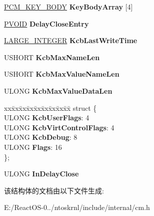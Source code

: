 \begin{DoxyCompactItemize}
\begin{tabbing}
\end{tabbing}\item 
\mbox{\label{struct___c_m___k_e_y___c_o_n_t_r_o_l___b_l_o_c_k_aa6c5935056a5008230d3e998815fb361}} 
\hyperlink{struct___c_m___k_e_y___b_o_d_y}{P\+C\+M\+\_\+\+K\+E\+Y\+\_\+\+B\+O\+DY} {\bfseries Key\+Body\+Array} \mbox{[}4\mbox{]}
\item 
\mbox{\label{struct___c_m___k_e_y___c_o_n_t_r_o_l___b_l_o_c_k_aef19401f073aca600781183293df3442}} 
\hyperlink{interfacevoid}{P\+V\+O\+ID} {\bfseries Delay\+Close\+Entry}
\item 
\mbox{\label{struct___c_m___k_e_y___c_o_n_t_r_o_l___b_l_o_c_k_aa583e52da860568cb791b0f5a3a36351}} 
\hyperlink{union___l_a_r_g_e___i_n_t_e_g_e_r}{L\+A\+R\+G\+E\+\_\+\+I\+N\+T\+E\+G\+ER} {\bfseries Kcb\+Last\+Write\+Time}
\item 
\mbox{\label{struct___c_m___k_e_y___c_o_n_t_r_o_l___b_l_o_c_k_abdf7a176c65e6b5ebc76778fa38a23a3}} 
U\+S\+H\+O\+RT {\bfseries Kcb\+Max\+Name\+Len}
\item 
\mbox{\label{struct___c_m___k_e_y___c_o_n_t_r_o_l___b_l_o_c_k_a214d1eb666b2fb3b4dcfc6b5f75eba35}} 
U\+S\+H\+O\+RT {\bfseries Kcb\+Max\+Value\+Name\+Len}
\item 
\mbox{\label{struct___c_m___k_e_y___c_o_n_t_r_o_l___b_l_o_c_k_a2752f288b79643d2d550a5621632e4b8}} 
U\+L\+O\+NG {\bfseries Kcb\+Max\+Value\+Data\+Len}
\item 
\mbox{\label{struct___c_m___k_e_y___c_o_n_t_r_o_l___b_l_o_c_k_a7f53b0c1adfe363e83cd9fcd0cd5afc8}} 
\begin{tabbing}
xx\=xx\=xx\=xx\=xx\=xx\=xx\=xx\=xx\=\kill
struct \{\\
\>ULONG {\bfseries KcbUserFlags}: 4\\
\>ULONG {\bfseries KcbVirtControlFlags}: 4\\
\>ULONG {\bfseries KcbDebug}: 8\\
\>ULONG {\bfseries Flags}: 16\\
\}; \\

\end{tabbing}\item 
\mbox{\label{struct___c_m___k_e_y___c_o_n_t_r_o_l___b_l_o_c_k_ac278542d70ed5cc07445c62e89b1f5b4}} 
U\+L\+O\+NG {\bfseries In\+Delay\+Close}
\end{DoxyCompactItemize}


该结构体的文档由以下文件生成\+:\begin{DoxyCompactItemize}
\item 
E\+:/\+React\+O\+S-\/0../ntoskrnl/include/internal/cm.\+h\end{DoxyCompactItemize}
